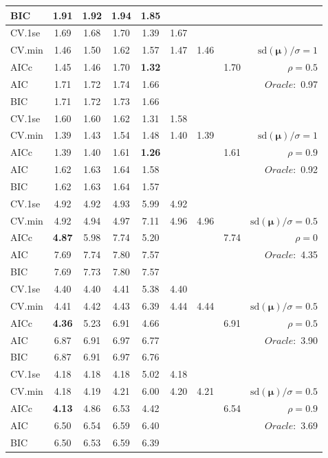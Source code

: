 \begin{table}
\begin{center}
\begin{tabular}{l*{7}{c}|r}
BIC & 1.91 & 1.92 & 1.94 & 1.85 & & & &  \\
 \hline 
CV.1se & 1.69 & 1.68 & 1.70 & 1.39 & 1.67 & & & \\
CV.min & 1.46 & 1.50 & 1.62 & 1.57 & 1.47 & 1.46 & & $\mathrm{sd}(\mathbf{\mu})/\sigma=1$ \\
AICc & 1.45 & 1.46 & 1.70 & {\bf 1.32} & & & 1.70 &  $\rho=0.5$ \\
AIC & 1.71 & 1.72 & 1.74 & 1.66 & & & &  \multirow{2}{*}{$Oracle: $ 0.97} \\
BIC & 1.71 & 1.72 & 1.73 & 1.66 & & & &  \\
 \hline 
CV.1se & 1.60 & 1.60 & 1.62 & 1.31 & 1.58 & & & \\
CV.min & 1.39 & 1.43 & 1.54 & 1.48 & 1.40 & 1.39 & & $\mathrm{sd}(\mathbf{\mu})/\sigma=1$ \\
AICc & 1.39 & 1.40 & 1.61 & {\bf 1.26} & & & 1.61 &  $\rho=0.9$ \\
AIC & 1.62 & 1.63 & 1.64 & 1.58 & & & &  \multirow{2}{*}{$Oracle: $ 0.92} \\
BIC & 1.62 & 1.63 & 1.64 & 1.57 & & & &  \\
 \hline 
CV.1se & 4.92 & 4.92 & 4.93 & 5.99 & 4.92 & & & \\
CV.min & 4.92 & 4.94 & 4.97 & 7.11 & 4.96 & 4.96 & & $\mathrm{sd}(\mathbf{\mu})/\sigma=0.5$ \\
AICc & {\bf 4.87} & 5.98 & 7.74 & 5.20 & & & 7.74 &  $\rho=0$ \\
AIC & 7.69 & 7.74 & 7.80 & 7.57 & & & &  \multirow{2}{*}{$Oracle: $ 4.35} \\
BIC & 7.69 & 7.73 & 7.80 & 7.57 & & & &  \\
 \hline 
CV.1se & 4.40 & 4.40 & 4.41 & 5.38 & 4.40 & & & \\
CV.min & 4.41 & 4.42 & 4.43 & 6.39 & 4.44 & 4.44 & & $\mathrm{sd}(\mathbf{\mu})/\sigma=0.5$ \\
AICc & {\bf 4.36} & 5.23 & 6.91 & 4.66 & & & 6.91 &  $\rho=0.5$ \\
AIC & 6.87 & 6.91 & 6.97 & 6.77 & & & &  \multirow{2}{*}{$Oracle: $ 3.90} \\
BIC & 6.87 & 6.91 & 6.97 & 6.76 & & & &  \\
 \hline 
CV.1se & 4.18 & 4.18 & 4.18 & 5.02 & 4.18 & & & \\
CV.min & 4.18 & 4.19 & 4.21 & 6.00 & 4.20 & 4.21 & & $\mathrm{sd}(\mathbf{\mu})/\sigma=0.5$ \\
AICc & {\bf 4.13} & 4.86 & 6.53 & 4.42 & & & 6.54 &  $\rho=0.9$ \\
AIC & 6.50 & 6.54 & 6.59 & 6.40 & & & &  \multirow{2}{*}{$Oracle: $ 3.69} \\
BIC & 6.50 & 6.53 & 6.59 & 6.39 & & & &  \\
 \hline 
\end{tabular}
\end{center}
\vspace{-1cm}
\end{table}





